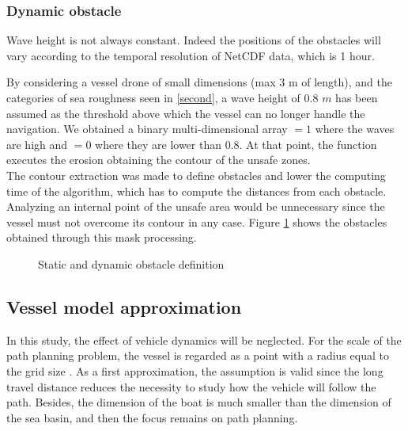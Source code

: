 \subsubsection{Dynamic obstacle}
Wave height is not always constant. Indeed the positions of the obstacles will vary according to the temporal resolution of NetCDF data, which is 1 hour.

By considering a vessel drone of small dimensions (max 3 m of length), and the categories of sea roughness seen in \autoref{second}, a wave height of $0.8$ $m$ has been assumed as the threshold above which the vessel can no longer handle the navigation. We obtained a binary multi-dimensional array $=1$ where the waves are high and $=0$ where they are lower than $0.8$. At that point, the function executes the erosion obtaining the contour of the unsafe zones. \\
The contour extraction was made to define obstacles and lower the computing time of the algorithm, which has to compute the distances from each obstacle. Analyzing an internal point of the unsafe area would be unnecessary since the vessel must not overcome its contour in any case. Figure \ref{staticdynamicobs} shows the obstacles obtained through this mask processing.
\begin{figure}[h]
	\centering 
	\hspace{0.5cm}
	\hspace{0.5cm}
	\hspace{0.5cm}
	\vspace{0.0cm}
	\caption{Static and dynamic obstacle definition} 
	\label{staticdynamicobs}
\end{figure}
\subsection{Vessel model approximation}
In this study, the effect of vehicle dynamics will be neglected. For the scale of the path planning problem, the vessel is regarded as a point with a radius equal to the grid size  \cite{garau2009path, SONG2017301, xiong2020rapidly, zhou2020review}.
As a first approximation, the assumption is valid since the long travel distance reduces the necessity to study how the vehicle will follow the path. Besides, the dimension of the boat is much smaller than the dimension of the sea basin, and then the focus remains on path planning. 

